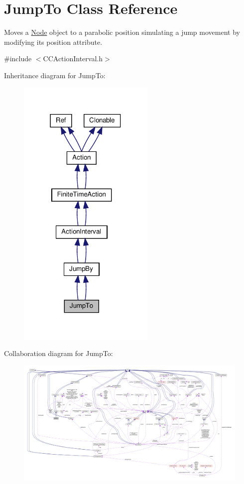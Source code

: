 \hypertarget{classJumpTo}{}\section{Jump\+To Class Reference}
\label{classJumpTo}


Moves a \hyperlink{classNode}{Node} object to a parabolic position simulating a jump movement by modifying it\textquotesingle{}s position attribute.  




{\ttfamily \#include $<$C\+C\+Action\+Interval.\+h$>$}



Inheritance diagram for Jump\+To\+:
\nopagebreak
\begin{figure}[H]
\begin{center}
\leavevmode
\includegraphics[width=186pt]{classJumpTo__inherit__graph}
\end{center}
\end{figure}


Collaboration diagram for Jump\+To\+:
\nopagebreak
\begin{figure}[H]
\begin{center}
\leavevmode
\includegraphics[width=350pt]{classJumpTo__coll__graph}
\end{center}
\end{figure}
